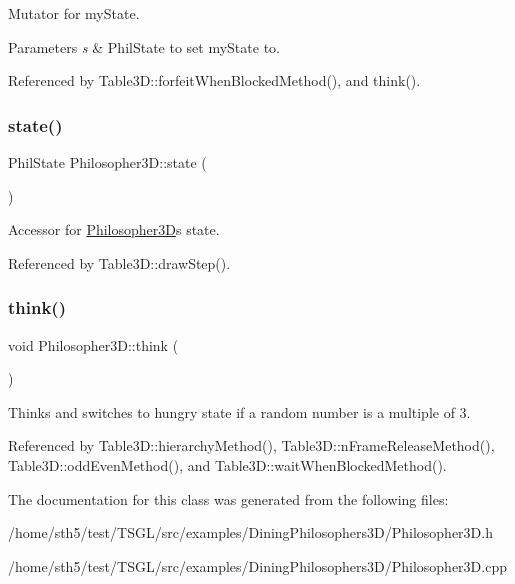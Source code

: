 Mutator for my\+State. 


\begin{DoxyParams}{Parameters}
{\em s} & Phil\+State to set my\+State to. \\
\hline
\end{DoxyParams}


Referenced by Table3\+D\+::forfeit\+When\+Blocked\+Method(), and think().

\mbox{\label{class_philosopher3_d_a515fb48855cd2a9421c13d6097953a10}} 
\subsubsection{\texorpdfstring{state()}{state()}}
{\footnotesize\ttfamily Phil\+State Philosopher3\+D\+::state (\begin{DoxyParamCaption}{ }\end{DoxyParamCaption})\hspace{0.3cm}{\ttfamily [inline]}}

Accessor for \hyperlink{class_philosopher3_d}{Philosopher3D}\textquotesingle{}s state. 

Referenced by Table3\+D\+::draw\+Step().

\mbox{\label{class_philosopher3_d_a586456ca9cc859018aa47564f235c933}} 
\subsubsection{\texorpdfstring{think()}{think()}}
{\footnotesize\ttfamily void Philosopher3\+D\+::think (\begin{DoxyParamCaption}{ }\end{DoxyParamCaption})}

Thinks and switches to hungry state if a random number is a multiple of 3. 

Referenced by Table3\+D\+::hierarchy\+Method(), Table3\+D\+::n\+Frame\+Release\+Method(), Table3\+D\+::odd\+Even\+Method(), and Table3\+D\+::wait\+When\+Blocked\+Method().



The documentation for this class was generated from the following files\+:\begin{DoxyCompactItemize}
\item 
/home/sth5/test/\+T\+S\+G\+L/src/examples/\+Dining\+Philosophers3\+D/Philosopher3\+D.\+h\item 
/home/sth5/test/\+T\+S\+G\+L/src/examples/\+Dining\+Philosophers3\+D/Philosopher3\+D.\+cpp\end{DoxyCompactItemize}
